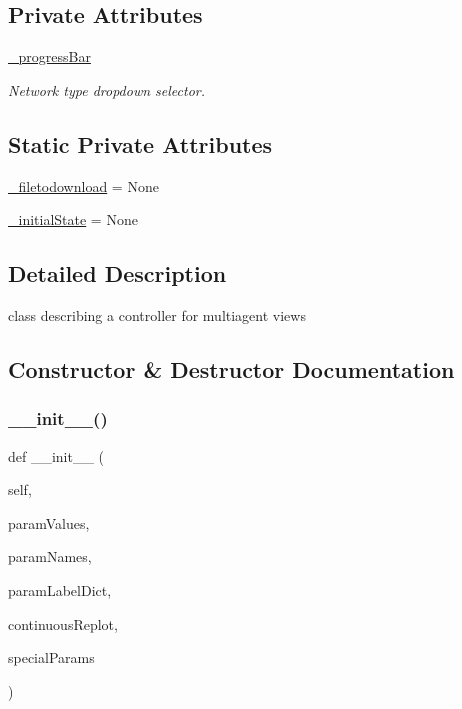 \subsection*{Private Attributes}
\begin{DoxyCompactItemize}
\item 
\hyperlink{class_mu_mo_t_1_1_mu_mo_tmultiagent_controller_a018864aa22d2adb0d3958fb0adbce8e2}{\+\_\+progress\+Bar}
\begin{DoxyCompactList}\small\item\em Network type dropdown selector. \end{DoxyCompactList}\end{DoxyCompactItemize}
\subsection*{Static Private Attributes}
\begin{DoxyCompactItemize}
\item 
\hyperlink{class_mu_mo_t_1_1_mu_mo_tmultiagent_controller_a559b8292a88eb343bf8591754cf168ef}{\+\_\+filetodownload} = None
\item 
\hyperlink{class_mu_mo_t_1_1_mu_mo_tmultiagent_controller_a8afeb8cf5705c6b521f7d6658dab955b}{\+\_\+initial\+State} = None
\end{DoxyCompactItemize}


\subsection{Detailed Description}
class describing a controller for multiagent views 

\subsection{Constructor \& Destructor Documentation}
\mbox{\label{class_mu_mo_t_1_1_mu_mo_tmultiagent_controller_a203e76c007a565312c5715712851aadb}} 
\subsubsection{\texorpdfstring{\+\_\+\+\_\+init\+\_\+\+\_\+()}{\_\_init\_\_()}}
{\footnotesize\ttfamily def \+\_\+\+\_\+init\+\_\+\+\_\+ (\begin{DoxyParamCaption}\item[{}]{self,  }\item[{}]{param\+Values,  }\item[{}]{param\+Names,  }\item[{}]{param\+Label\+Dict,  }\item[{}]{continuous\+Replot,  }\item[{}]{special\+Params }\end{DoxyParamCaption})}



